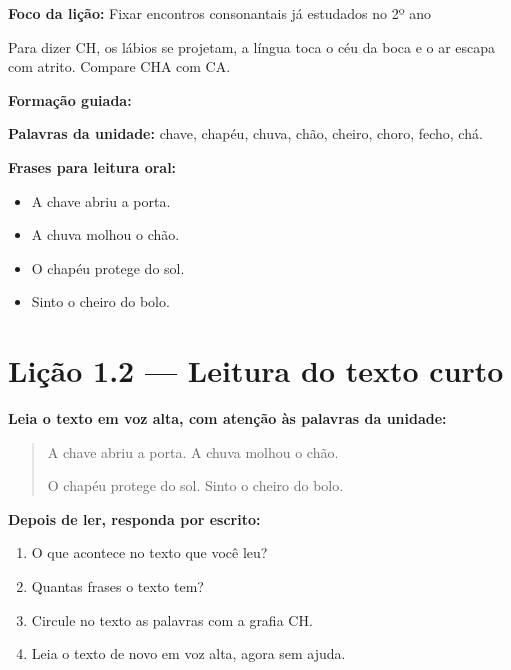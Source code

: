 \textbf{Foco da lição:} Fixar encontros consonantais já estudados no 2º ano


\begin{boquinha}
Para dizer CH, os lábios se projetam, a língua toca o céu da boca e o ar escapa com atrito. Compare CHA com CA.
\end{boquinha}

\noindent\textbf{Formação guiada:}

\begin{center}
\end{center}

\noindent\textbf{Palavras da unidade:} chave, chapéu, chuva, chão, cheiro, choro, fecho, chá.

\noindent\textbf{Frases para leitura oral:}
\begin{itemize}[leftmargin=1.6em]
  \item A chave abriu a porta.
  \item A chuva molhou o chão.
  \item O chapéu protege do sol.
  \item Sinto o cheiro do bolo.
\end{itemize}

\section{Lição 1.2 --- Leitura do texto curto}

\noindent\textbf{Leia o texto em voz alta, com atenção às palavras da unidade:}


\begin{quote}
A chave abriu a porta. A chuva molhou o chão.

O chapéu protege do sol. Sinto o cheiro do bolo.
\end{quote}

\textbf{Depois de ler, responda por escrito:}
\begin{enumerate}

  \item O que acontece no texto que você leu?
  \begin{center}
  \underline{\hspace{12cm}}
  \end{center}

  \item Quantas frases o texto tem?
  \begin{center}
  \underline{\hspace{12cm}}
  \end{center}

  \item Circule no texto as palavras com a grafia CH.

  \item Leia o texto de novo em voz alta, agora sem ajuda.

\end{enumerate}

